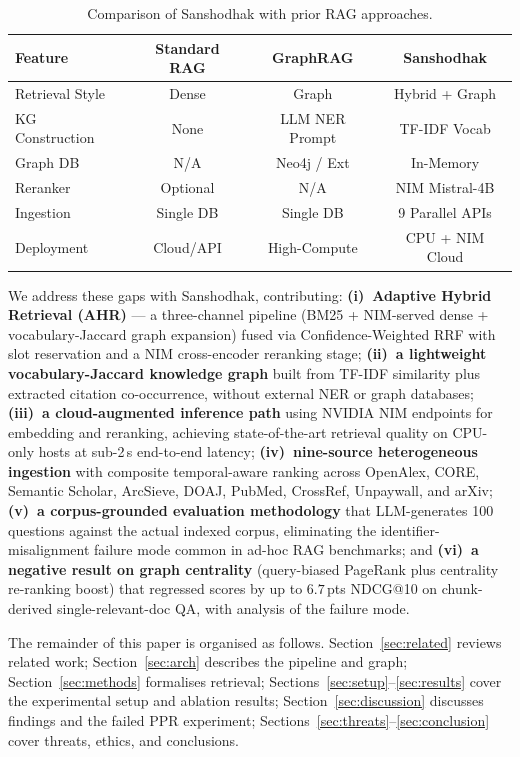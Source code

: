 \documentclass[journal]{IEEEtran}
\begin{document}
\begin{table}[!t]
\centering
\caption{Comparison of Sanshodhak with prior RAG approaches.}
\label{tab:comparison}
\footnotesize
\setlength{\tabcolsep}{4pt}
\begin{tabular}{@{}lccc@{}}
\toprule
\textbf{Feature} & \textbf{Standard RAG} & \textbf{GraphRAG} & \textbf{Sanshodhak} \\
\midrule
Retrieval Style    & Dense           & Graph              & Hybrid + Graph \\
KG Construction    & None            & LLM NER Prompt     & TF-IDF Vocab \\
Graph DB           & N/A             & Neo4j / Ext        & In-Memory \\
Reranker           & Optional        & N/A                & NIM Mistral-4B \\
Ingestion          & Single DB       & Single DB          & 9 Parallel APIs \\
Deployment         & Cloud/API       & High-Compute       & CPU + NIM Cloud \\
\bottomrule
\end{tabular}
\end{table}

We address these gaps with Sanshodhak, contributing:
\textbf{(i)~Adaptive Hybrid Retrieval (AHR)} — a three-channel
pipeline (BM25 + NIM-served dense + vocabulary-Jaccard graph
expansion) fused via Confidence-Weighted RRF with slot reservation
and a NIM cross-encoder reranking stage;
\textbf{(ii)~a lightweight vocabulary-Jaccard knowledge graph}
built from TF-IDF similarity plus extracted citation co-occurrence,
without external NER or graph databases;
\textbf{(iii)~a cloud-augmented inference path} using NVIDIA NIM
endpoints for embedding and reranking, achieving state-of-the-art
retrieval quality on CPU-only hosts at sub-2\,s end-to-end latency;
\textbf{(iv)~nine-source heterogeneous ingestion} with composite
temporal-aware ranking across OpenAlex, CORE, Semantic Scholar,
ArcSieve, DOAJ, PubMed, CrossRef, Unpaywall, and arXiv;
\textbf{(v)~a corpus-grounded evaluation methodology} that
LLM-generates 100 questions against the actual indexed corpus,
eliminating the identifier-misalignment failure mode common in
ad-hoc RAG benchmarks; and
\textbf{(vi)~a negative result on graph centrality} (query-biased
PageRank plus centrality re-ranking boost) that regressed scores by
up to $6.7$\,pts NDCG@10 on chunk-derived single-relevant-doc QA, with
analysis of the failure mode.

The remainder of this paper is organised as follows. Section~\ref{sec:related}
reviews related work; Section~\ref{sec:arch} describes the pipeline
and graph; Section~\ref{sec:methods} formalises retrieval;
Sections~\ref{sec:setup}--\ref{sec:results} cover the experimental
setup and ablation results; Section~\ref{sec:discussion} discusses
findings and the failed PPR experiment;
Sections~\ref{sec:threats}--\ref{sec:conclusion} cover threats,
ethics, and conclusions.
\end{document}
